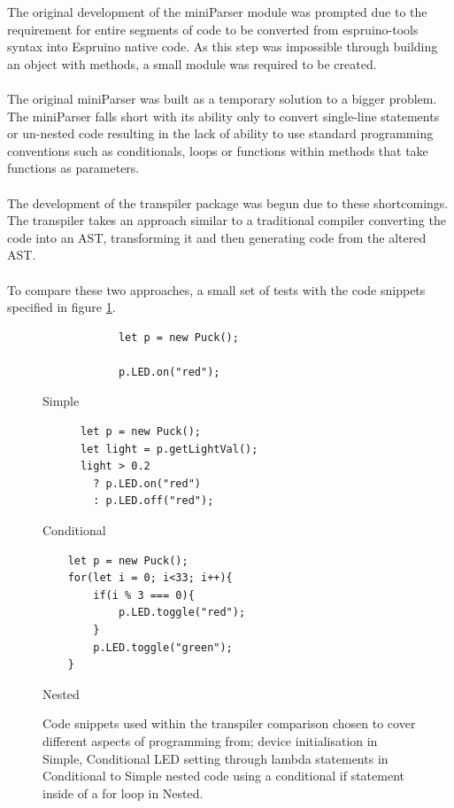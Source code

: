 \documentclass{l4proj}
\begin{document}
The original development of the miniParser module was prompted due to the requirement for entire segments of code to be converted from espruino-tools syntax into Espruino native code. As this step was impossible through building an object with methods, a small module was required to be created.
\\ \\
The original miniParser was built as a temporary solution to a bigger problem. The miniParser falls short with its ability only to convert single-line statements or un-nested code resulting in the lack of ability to use standard programming conventions such as conditionals, loops or functions within methods that take functions as parameters. 
\\ \\ 
The development of the transpiler package was begun due to these shortcomings. The transpiler takes an approach similar to a traditional compiler converting the code into an AST, transforming it and then generating code from the altered AST.
\\ \\ 
To compare these two approaches, a small set of tests with the code snippets specified in figure \ref{fig:transpiler_code_snippets}.

\begin{figure}[H]
    \centering
    \begin{minipage}{3.5cm}
        \centering
        \begin{lstlisting}
            let p = new Puck();
        
            p.LED.on("red");
        \end{lstlisting}
        Simple
    \end{minipage}
    \hspace{0.5cm}
    \begin{minipage}{3.5cm}
        \centering
    \begin{lstlisting}
      let p = new Puck();
      let light = p.getLightVal();
      light > 0.2 
        ? p.LED.on("red") 
        : p.LED.off("red");
    \end{lstlisting}
    Conditional
    \end{minipage}
    \hspace{0.5cm}
    \begin{minipage}{4.5cm}
        \centering
        \begin{lstlisting}
    let p = new Puck();
    for(let i = 0; i<33; i++){
        if(i % 3 === 0){
            p.LED.toggle("red");
        }
        p.LED.toggle("green");
    }
    \end{lstlisting}
    Nested
    \end{minipage}
    \caption{Code snippets used within the transpiler comparison chosen to cover different aspects of programming from; device initialisation in Simple, Conditional LED setting through lambda statements in Conditional to Simple nested code using a conditional if statement inside of a for loop in Nested.}
    \label{fig:transpiler_code_snippets}
\end{figure}
\end{document}
